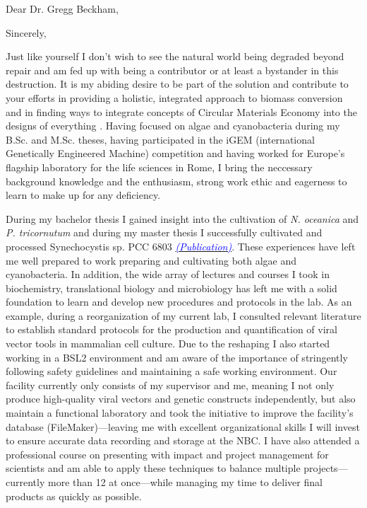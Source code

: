 \documentclass[11pt,a4paper,sans]{moderncv}
\begin{document}
\date{\today}
\opening{Dear Dr. Gregg Beckham,}
\closing{Sincerely,}
\makelettertitle
\begin{spacing}{1.15}

Just like yourself I don't wish to see the natural world being degraded beyond repair and am fed up with being a contributor or at least a bystander in this destruction. 
It is my abiding desire to be part of the solution and contribute to your efforts in providing a holistic, integrated approach to biomass conversion and in finding ways to integrate concepts of Circular Materials Economy into the designs of everything . 
Having focused on algae and cyanobacteria during my B.Sc. and M.Sc. theses, having participated in the iGEM (international Genetically Engineered Machine) competition and having worked for Europe's flagship laboratory for the life sciences in Rome, I bring the neccessary background knowledge and the enthusiasm, strong work ethic and eagerness to learn to make up for any deficiency.\par\vspace*{1mm}

During my bachelor thesis I gained insight into the cultivation of \textit{N. oceanica} and \textit{P. tricornutum} and during my master thesis I successfully cultivated and processed Synechocystis sp. PCC 6803 {\href{https://www.ncbi.nlm.nih.gov/pubmed/29517395}{\textcolor{blue}{{\textit{(Publication)}}}}}. 
These experiences have left me well prepared to work preparing and cultivating both algae and cyanobacteria. 
In addition, the wide array of lectures and courses I took in biochemistry, translational biology and microbiology has  left me with a solid foundation to learn and develop new procedures and protocols in the lab. 
As an example, during a reorganization of my current lab, I consulted relevant literature to establish standard protocols for the production and quantification of viral vector tools in mammalian cell culture. 
Due to the reshaping I also started working in a BSL2 environment and am aware of the importance of stringently following safety guidelines and maintaining a safe working environment. 
Our facility currently only consists of my supervisor and me, meaning I not only produce high-quality viral vectors and genetic constructs independently, but also maintain a functional laboratory and took the initiative to improve the facility's database (FileMaker)---leaving me with excellent organizational skills I will invest to ensure accurate data recording and storage at the NBC.  
I have also attended a professional course on presenting with impact and project management for scientists and am able to apply these techniques to balance multiple projects---currently more than 12 at once---while managing my time to deliver final products as quickly as possible.  \par%


\end{spacing}
\end{document}
